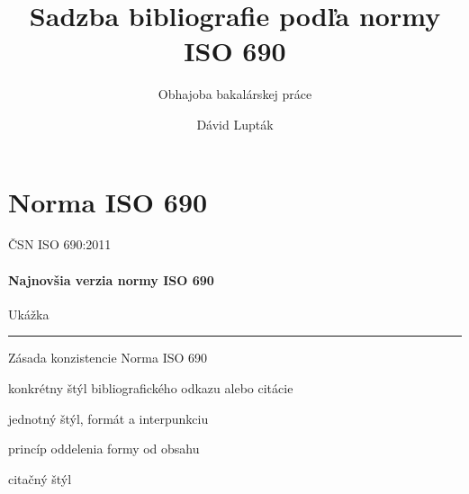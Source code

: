 \documentclass{beamer}
\author{Dávid Lupták}
\title{Sadzba bibliografie podľa normy ISO 690}
\subtitle{Obhajoba bakalárskej práce}
\begin{document}
\frame{\titlepage}

\frame{\tableofcontents}

\section{Norma ISO 690}

\begin{frame}{ČSN ISO 690:2011}
\framesubtitle{Najnovšia verzia normy ISO 690}
\end{frame}


\begin{refsection} %
\begin{frame}{Ukážka}
\rule{\textwidth}{0.2pt}
\printbibliography
\end{frame}
\end{refsection}

\begin{frame}{Zásada konzistencie}
Norma ISO 690
\begin{description}[nešpecifikuje]
\item[nešpecifikuje] konkrétny štýl bibliografického odkazu alebo citácie
\item[doporučuje] jednotný štýl, formát a interpunkciu
\end{description}
\begin{center}
\end{center}
\begin{description}[nešpecifikuje]
\item<2>[uctieva] princíp oddelenia formy od obsahu
\item<2>[nie je] citačný štýl 
\end{description}
\end{frame}
\end{document}
